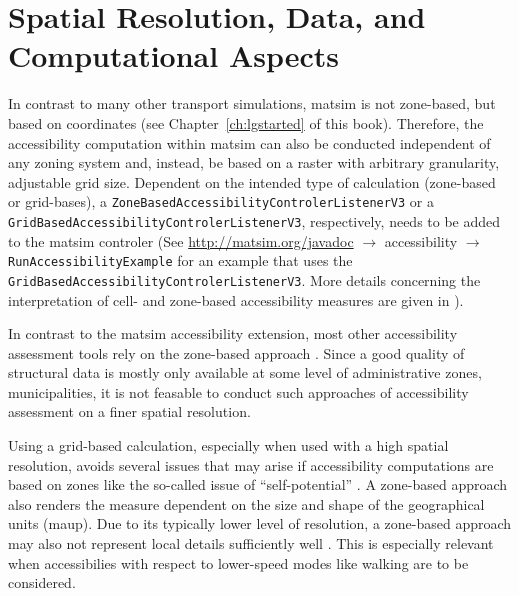 
\section{Spatial Resolution, Data, and Computational Aspects}
In contrast to many other transport simulations, \gls{matsim} is not zone-based, but based on coordinates (see 
Chapter~\ref{ch:lgstarted} of this book).
Therefore, the accessibility computation within \gls{matsim} can also be conducted independent 
of any zoning system and, instead, be based on a raster with arbitrary granularity, \ie adjustable grid
size. Dependent on the intended type of calculation (zone-based or grid-bases), a 
\lstinline{ZoneBasedAccessibilityControlerListenerV3} or a 
\lstinline{GridBasedAccessibilityControlerListenerV3}, respectively, needs to be added to the \gls{matsim} controler 
(See \url{http://matsim.org/javadoc} $\to$ accessibility $\to$ \lstinline{RunAccessibilityExample} for an example
that uses the \lstinline{GridBasedAccessibilityControlerListenerV3}. More details concerning the interpretation
of cell- and zone-based accessibility measures are given in \citet{NicolaiNagel2012HiResAccessibilityMethodInBook}).

In contrast to the \gls{matsim} accessibility extension, most other accessibility assessment tools
rely on the zone-based approach 
\citep{CurtisEtAl2013AccessibilityPolicyInnovation, LiuZhu2004AccessibilityAnalyst, BuettnerEtAl2010Erreichbarkeitsatlas}.
Since a good quality of structural data is mostly only available at some level of administrative zones, 
\eg municipalities, it is not feasable to conduct such approaches of accessibility assessment on a finer 
spatial resolution.

Using a grid-based calculation, especially when used with a high spatial resolution, avoids several issues
that may arise if accessibility computations are based on zones like the so-called issue of ``self-potential''
\citep[see, e.g.,][]{NicolaiNagel2012HiResAccessibilityMethodInBook}. A zone-based approach also renders the 
measure dependent on the size and shape of the geographical units (\cf \gls{maup}). 
Due to its typically lower level of resolution, a zone-based approach may also
not represent local details sufficiently well \citep{Kwan1998PointBasedAccessibility}. This is especially relevant
when accessibilies with respect to lower-speed modes like walking are to be considered.

